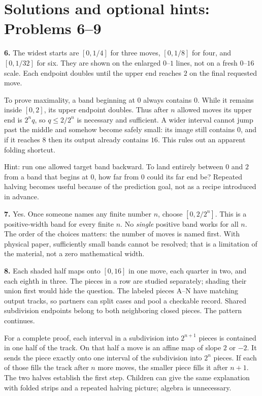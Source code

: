 \documentclass[11pt,letterpaper]{article}
\begin{document}
\section*{Solutions and optional hints: Problems 6--9}
\textbf{6.} The widest starts are $[0,1/4]$ for three moves, $[0,1/8]$ for four, and $[0,1/32]$ for six. They are shown on the enlarged $0$--$1$ lines, not on a fresh $0$--$16$ scale. Each endpoint doubles until the upper end reaches $2$ on the final requested move.

To prove maximality, a band beginning at $0$ always contains $0$. While it remains inside $[0,2]$, its upper endpoint doubles. Thus after $n$ allowed moves its upper end is $2^nq$, so $q\le2/2^n$ is necessary and sufficient. A wider interval cannot jump past the middle and somehow become safely small: its image still contains $0$, and if it reaches $8$ then its output already contains $16$. This rules out an apparent folding shortcut.

Hint: run one allowed target band backward. To land entirely between $0$ and $2$ from a band that begins at $0$, how far from $0$ could its far end be? Repeated halving becomes useful because of the prediction goal, not as a recipe introduced in advance.

\textbf{7.} Yes. Once someone names any finite number $n$, choose $[0,2/2^n]$. This is a positive-width band for every finite $n$. No \emph{single} positive band works for all $n$. The order of the choices matters: the number of moves is named first. With physical paper, sufficiently small bands cannot be resolved; that is a limitation of the material, not a zero mathematical width.

\textbf{8.} Each shaded half maps onto $[0,16]$ in one move, each quarter in two, and each eighth in three. The pieces in a row are studied separately; shading their union first would hide the question. The labeled pieces A--N have matching output tracks, so partners can split cases and pool a checkable record. Shared subdivision endpoints belong to both neighboring closed pieces. The pattern continues.

For a complete proof, each interval in a subdivision into $2^{n+1}$ pieces is contained in one half of the track. On that half a move is an affine map of slope $2$ or $-2$. It sends the piece exactly onto one interval of the subdivision into $2^n$ pieces. If each of those fills the track after $n$ more moves, the smaller piece fills it after $n+1$. The two halves establish the first step. Children can give the same explanation with folded strips and a repeated halving picture; algebra is unnecessary.
\end{document}
